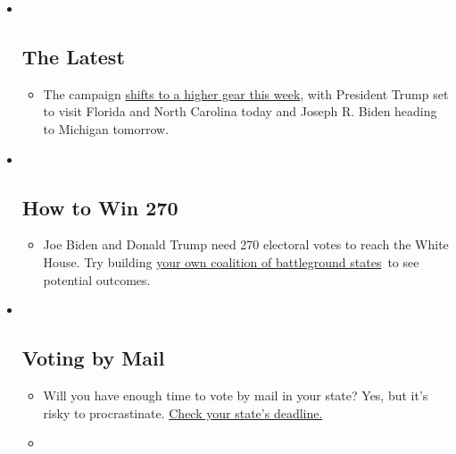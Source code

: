 \begin{itemize}
\item ~
  \hypertarget{the-latest}{%
  \subsection{The Latest}\label{the-latest}}

  \begin{itemize}
  \item
    The campaign
    \href{https://www.nytimes3xbfgragh.onion/live/2020/09/08/us/trump-vs-biden?action=click\&pgtype=Article\&state=default\&region=BELOW_MAIN_CONTENT\&context=storylines_guide}{shifts
    to a higher gear this week}, with President Trump set to visit
    Florida and North Carolina today and Joseph R. Biden heading to
    Michigan tomorrow.
  \end{itemize}
\item ~
  \hypertarget{how-to-win-270}{%
  \subsection{How to Win 270}\label{how-to-win-270}}

  \begin{itemize}
  \item
    Joe Biden and Donald Trump need 270 electoral votes to reach the
    White House. Try building
    \href{https://www.nytimes3xbfgragh.onion/interactive/2020/us/elections/election-states-biden-trump.html?action=click\&pgtype=Article\&state=default\&region=BELOW_MAIN_CONTENT\&context=storylines_guide}{your
    own coalition of battleground states}~to see potential outcomes.
  \end{itemize}
\item ~
  \hypertarget{voting-by-mail}{%
  \subsection{Voting by Mail}\label{voting-by-mail}}

  \begin{itemize}
  \item
    Will you have enough time to vote by mail in your state? Yes, but
    it's risky to procrastinate.
    \href{https://www.nytimes3xbfgragh.onion/interactive/2020/08/31/us/politics/vote-by-mail-deadlines.html?action=click\&pgtype=Article\&state=default\&region=BELOW_MAIN_CONTENT\&context=storylines_guide}{Check
    your state's deadline.}
  \item
    \href{https://www.nytimes3xbfgragh.onion/interactive/2020/us/elections/joe-biden.html?action=click\&pgtype=Article\&state=default\&region=BELOW_MAIN_CONTENT\&context=storylines_guide}{}


\end{itemize}
\end{itemize}
